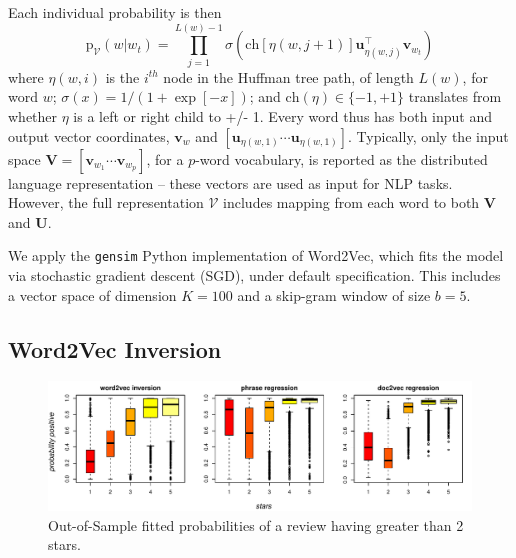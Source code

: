 \documentclass[11pt]{article}
\begin{document}
Each individual probability is then
\begin{equation} \label{eq:neuralnet}
\mathrm{p}_{\mathcal{V}}(w | w_t) =\!\!\!
 \prod_{j=1}^{L(w)-1} \!\!\!\sigma\!\left( \mathrm{ch}\left[\eta(w,j+1)\right] \mathbf{u}_{\eta(w,j)}^\top \mathbf{v}_{w_t} \right) 
\end{equation}
where $\eta(w,i)$ is the $i^{th}$ node in the Huffman tree path, of  length $L(w)$, for word $w$; $\sigma(x) = 1/(1 + \exp[-x])$; and $\mathrm{ch}(\eta)
\in \{-1,+1\}$ translates from whether $\eta$ is a left or right child to +/-
1.  Every word thus has both input and output vector coordinates,
$\mathbf{v}_w$ and $[\mathbf{u}_{\eta(w,1)} \cdots \mathbf{u}_{\eta(w,1)}]$.
Typically, only the input space $\mathbf{V} = [\mathbf{v}_{w_1} \cdots \mathbf{v}_{w_p}]$,
for a $p$-word vocabulary, is reported as the distributed language
representation -- these vectors are used as input for NLP tasks.    However,
the full representation $\mathcal{V}$ includes mapping from each word to both
$\mathbf{V}$ and $\mathbf{U}$.

We apply the
\texttt{gensim} Python implementation of Word2Vec, which fits the model via stochastic gradient descent (SGD),  under default specification.  This includes a vector space of dimension $K=100$ and a skip-gram window of size $b=5$.  

\subsection{Word2Vec Inversion}


\begin{figure}

\includegraphics[width=.98\textwidth]{../graphs/coarseprob_bystar}
\caption{\label{pic:coarseprob} Out-of-Sample fitted probabilities of a review having greater than 2 stars. 
}
\end{figure}
 
\end{document}
